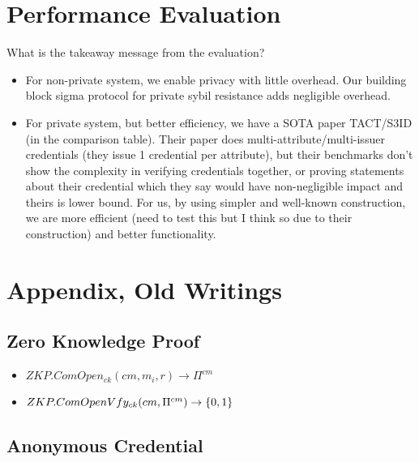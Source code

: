 \section{Performance Evaluation}\label{sec:evaluation}
What is the takeaway message from the evaluation?
\begin{itemize}
    \item For non-private system, we enable privacy with little overhead. Our building block sigma protocol for private sybil resistance adds negligible overhead. 
    \item For private system, but better efficiency, we have a SOTA paper TACT/S3ID (in the comparison table). Their paper does multi-attribute/multi-issuer credentials (they issue 1 credential per attribute), but their benchmarks don't show the complexity in verifying credentials together, or proving statements about their credential which they say would have non-negligible impact and theirs is lower bound. For us, by using simpler and well-known construction, we are more efficient (need to test this but I think so due to their construction) and better functionality. 
\end{itemize}


















\cleardoublepage
\section{Appendix, Old Writings}
\newpage


\subsection{Zero Knowledge Proof}
\begin{itemize}
    \item $ZKP.ComOpen_{ck}(cm, m_i, r) \to \Pi^{cm}$
    \item $ZKP.ComOpenVfy_{ck}(cm, \Pi^{cm}) \to \{0,1\}$
\end{itemize}

\subsection{Anonymous Credential}



